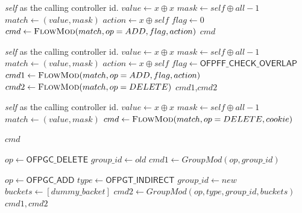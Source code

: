\documentclass[conference]{sigcomm-alternate}
\newcommand{\concat}[0]{\oplus}
\begin{document}
\begin{algorithm}[t]
    \caption{$\textit{claim}(x)$}
    \label{alg:claim}
    \begin{algorithmic}[1]
    \Require \emph{self} as the calling controller id.
    		\State $value \gets x\concat x$
    		\State $mask \gets self\concat all-1$
	    	\State $match \gets (value,mask)$
    		\State $action \gets x\concat self$
    		\State $flag \gets 0$
    		\State $cmd\gets \textsc{FlowMod}(match, op = ADD, flag, action) $
			\Return $cmd$
    \end{algorithmic}
\end{algorithm}

\begin{algorithm}[t]
    \caption{$\textit{check}(x)$}
    \label{alg:check}
    \begin{algorithmic}[1]
    \Require \emph{self} as the calling controller id.
    		\State $value \gets x\concat x$
    		\State $mask \gets self\concat all-1$
    		\State $match \gets (value,mask)$
    		\State $action \gets x\concat self$
    		\State $flag \gets \textsf{OFPFF\_CHECK\_OVERLAP}$
    		\State $cmd1\gets \textsc{FlowMod}(match, op = ADD, flag, action) $
    		\State $cmd2\gets \textsc{FlowMod}(match, op = DELETE) $
			\Return $cmd1$,$cmd2$
    \end{algorithmic}
\end{algorithm}

\begin{algorithm}[t]
    \caption{$\textit{unclaim}(x)$}
    \label{alg:unclaim}
    \begin{algorithmic}[1]
    \Require \emph{self} as the calling controller id.
    		\State $value \gets x\concat x$
    		\State $mask \gets self\concat all-1$
    		\State $match \gets (value,mask)$
    		\State $cmd\gets \textsc{FlowMod}(match, op=DELETE, cookie) $
    	
			
			\Return $cmd$
    \end{algorithmic}
\end{algorithm}


\begin{algorithm}[t]
    \caption{$\textit{CAS}(old,new)$}
    \label{alg:cas}
    \begin{algorithmic}[1]

    		\State $op \gets \textsf{OFPGC\_DELETE}$
    		\State $group\_id \gets old$
    		\State $cmd1\gets GroupMod(op, group\_id) $
    		
    		\State $op \gets \textsf{OFPGC\_ADD}$
    		\State $type \gets \textsf{OFPGT\_INDIRECT}$
    		\State $group\_id \gets new$
    		\State $buckets \gets [dummy\_backet]$
    		\State $cmd2\gets GroupMod(op, type, group\_id, buckets) $
			\Return $cmd1,cmd2$
    \end{algorithmic}
\end{algorithm}
\end{document}
